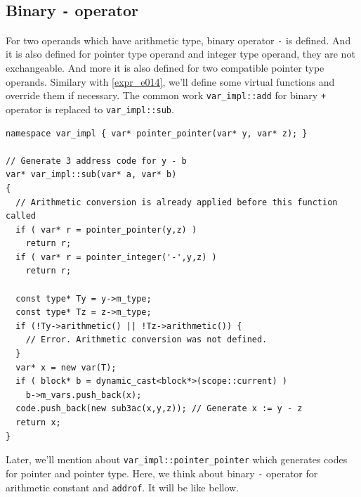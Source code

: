 \subsection{Binary {\tt{-}} operator}
\label{expr_e018}
For two operands which have arithmetic type, binary operator {\tt{-}}
is defined. And it is also defined for pointer type operand and integer type
operand, they are not exchangeable. And more it is also defined for
two compatible pointer type operands.
Similary with \ref{expr_e014}, we'll
define some virtual functions and override them if necessary.
The common work {\tt{var\_impl::add}} for binary {\tt{+}} operator
is replaced to {\tt{var\_impl::sub}}.
\begin{verbatim}
namespace var_impl { var* pointer_pointer(var* y, var* z); }

// Generate 3 address code for y - b
var* var_impl::sub(var* a, var* b)
{
  // Arithmetic conversion is already applied before this function called
  if ( var* r = pointer_pointer(y,z) )
    return r;
  if ( var* r = pointer_integer('-',y,z) )
    return r;

  const type* Ty = y->m_type;
  const type* Tz = z->m_type;
  if (!Ty->arithmetic() || !Tz->arithmetic()) {
    // Error. Arithmetic conversion was not defined. 
  }
  var* x = new var(T);
  if ( block* b = dynamic_cast<block*>(scope::current) )
    b->m_vars.push_back(x);
  code.push_back(new sub3ac(x,y,z)); // Generate x := y - z
  return x;
}
\end{verbatim}
Later, we'll mention about {\tt{var\_impl::pointer\_pointer}}
which generates codes for pointer and pointer type.
Here, we think about binary {\tt{-}} operator for
arithmetic constant and {\tt{addrof}}. It will be like bellow.
